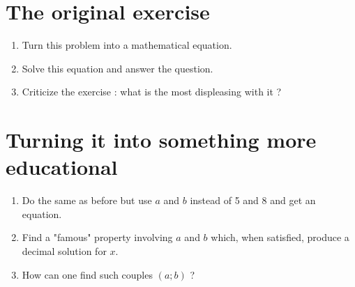 \documentclass[12pt,a4paper,article,english,firamath]{nsi}
\begin{document}
\maketitle

\section*{The original exercise}

\begin{enumerate}
    \item Turn this problem into a mathematical equation.
    \item Solve this equation and answer the question.
    \item Criticize the exercise : what is the most displeasing with it ?
\end{enumerate}
\section*{Turning it into something more educational}


\begin{enumerate}
    \item Do the same as before but use $a$ and $b$ instead of 5 and 8 and get an equation.
    \item Find a "famous" property involving $a$ and $b$  which, when satisfied, produce a decimal solution for $x$.
    \item How can one find such couples $(a;b)$ ?
\end{enumerate}
\end{document}
